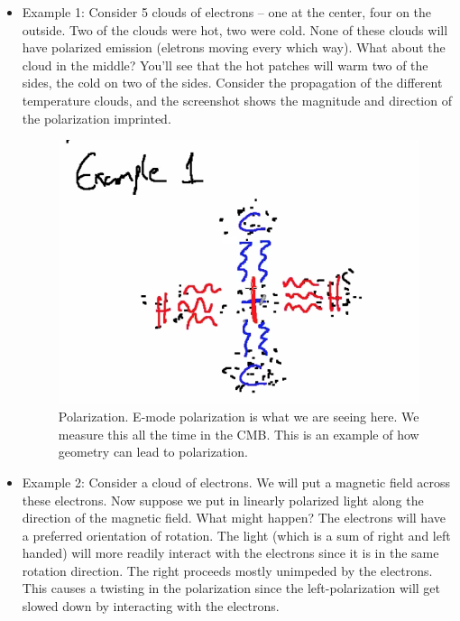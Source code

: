 \documentclass{article}
\begin{document}
\begin{itemize}
    \item Example 1: Consider 5 clouds of electrons -- one at the center, four on the outside. Two of the clouds were hot, two were cold. None of these clouds will have polarized emission (eletrons moving every which way). What about the cloud in the middle? You'll see that the hot patches will warm two of the sides, the cold on two of the sides. Consider the propagation of the different temperature clouds, and the screenshot shows the magnitude and direction of the polarization imprinted. 
    \begin{figure}
        \centering
        \includegraphics{Screen Shot 2020-10-27 at 11.52.03 AM.png}
        \caption{Polarization. E-mode polarization is what we are seeing here. We measure this all the time in the CMB. This is an example of how geometry can lead to polarization. }
        \label{fig:CMBpolarization}
    \end{figure}
    \item Example 2: Consider a cloud of electrons. We will put a magnetic field across these electrons. Now suppose we put in linearly polarized light along the direction of the magnetic field. What might happen? The electrons will have a preferred orientation of rotation. The light (which is a sum of right and left handed) will more readily interact with the electrons since it is in the same rotation direction. The right proceeds mostly unimpeded by the electrons. This causes a twisting in the polarization since the left-polarization will get slowed down by interacting with the electrons. 
\end{itemize}
\end{document}
